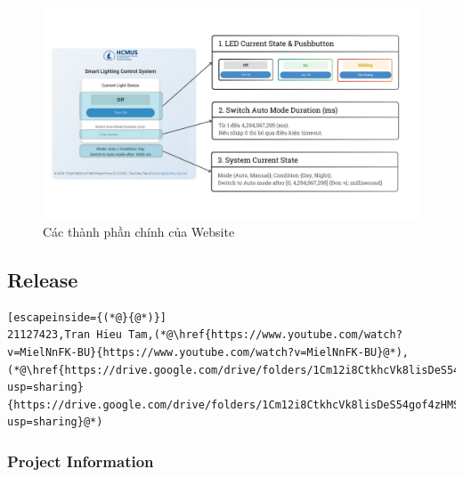 {\begin{figure}[!h]
    \centering
    \includegraphics[width=1\linewidth]{img/Web.jpg}
    \caption{Các thành phần chính của Website}
    \label{fig:enter-label}
\end{figure}

\pagebreak
\subsection{Release}
\begin{lstlisting}[escapeinside={(*@}{@*)}]
21127423,Tran Hieu Tam,(*@\href{https://www.youtube.com/watch?v=MielNnFK-BU}{https://www.youtube.com/watch?v=MielNnFK-BU}@*),(*@\href{https://drive.google.com/drive/folders/1Cm12i8CtkhcVk8lisDeS54gof4zHMSak?usp=sharing}{https://drive.google.com/drive/folders/1Cm12i8CtkhcVk8lisDeS54gof4zHMSak?usp=sharing}@*)
\end{lstlisting}









\vspace{1cm}
{\small
\subsubsection*{Project Information}

}}
